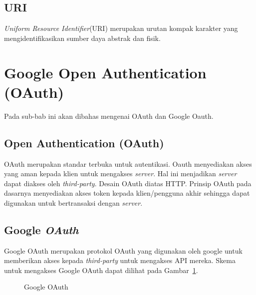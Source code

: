 \subsection{URI}
\label{subsec:uri}

\textit{Uniform Resource Identifier}(URI) merupakan urutan kompak karakter yang mengidentifikasikan sumber daya abstrak dan fisik\cite{rfc3986}.

\section{Google Open Authentication (OAuth)}
\label{sec:googleopenauthentication}

Pada sub-bab ini akan dibahas mengenai OAuth dan Google Oauth.

\subsection{Open Authentication (OAuth)}
\label{subsec:oauth}

\hspace{0,5cm}OAuth merupakan standar terbuka untuk autentikasi. Oauth menyediakan akses yang aman kepada klien untuk mengakses \textit{server}. Hal ini menjadikan \textit{server} dapat diakses oleh \textit{third-party}. Desain OAuth diatas HTTP. Prinsip OAuth pada dasarnya menyediakan akses token kepada klien/pengguna akhir sehingga dapat digunakan untuk bertransaksi dengan \textit{server}\cite{rfc6749}.

\subsection{Google \textit{OAuth}}
\label{subsec:googleip}

\hspace{0,5cm}Google OAuth merupakan protokol OAuth yang digunakan oleh google untuk memberikan akses kepada \textit{third-party} untuk mengakses API mereka. Skema untuk mengakses Google OAuth dapat dilihat pada Gambar~\ref{fig:google_oauth}.

\begin{figure}[h]
\centering
{}
\caption[Google OAuth]{Google OAuth} 
\label{fig:google_oauth}
\end{figure}

